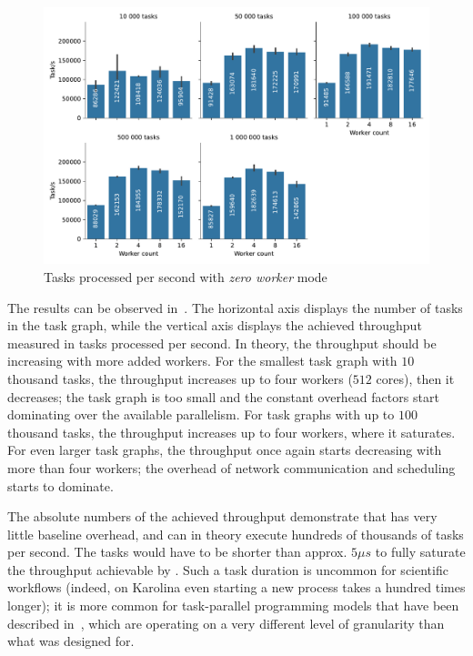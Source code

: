 \begin{figure}[h]
	\centering
	\includegraphics[width=\textwidth]{imgs/hq/charts/task-per-s}
	\caption{Tasks processed per second with \emph{zero worker} mode}
	\label{fig:hq-tasks-per-s}
\end{figure}

The results can be observed in~. The horizontal axis displays the number of
tasks in the task graph, while the vertical axis displays the achieved throughput measured in tasks
processed per second. In theory, the throughput should be increasing with more added workers. For
the smallest task graph with $10$ thousand tasks, the throughput increases up to
four workers ($512$ cores), then it decreases; the task graph is too small and the
constant overhead factors start dominating over the available parallelism. For task graphs with up
to $100$ thousand tasks, the throughput increases up to four workers, where it
saturates. For even larger task graphs, the throughput once again starts decreasing with more than
four workers; the overhead of network communication and scheduling starts to dominate.

The absolute numbers of the achieved throughput demonstrate that \hyperqueue{} has very
little baseline overhead, and can in theory execute hundreds of thousands of tasks per second. The
tasks would have to be shorter than approx. $5\mu{}s$ to fully saturate the throughput
achievable by \hyperqueue{}. Such a task duration is uncommon for scientific workflows
(indeed, on Karolina even starting a new process takes a hundred times longer); it is more common
for task-parallel programming models that have been described in~, which are
operating on a very different level of granularity than what \hyperqueue{} was designed
for.

